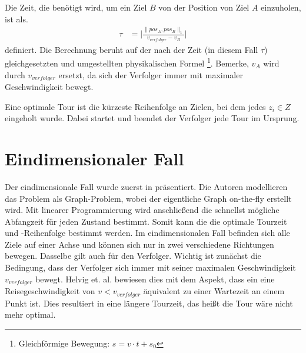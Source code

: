\documentclass[german,version-2019-11]{uzl-thesis}
\begin{document}
\begin{definition}
\label{def:WegZeit}
Die Zeit, die benötigt wird, um ein Ziel $B$ von der Position von Ziel $A$ einzuholen, ist als. 
\begin{align*}
\tau &= \bigg\vert\frac{\|pos_A,pos_B\|_1}{v_{verfolger}-v_B}\bigg\vert
\end{align*} 
definiert.
Die Berechnung beruht auf der nach der Zeit (in diesem Fall $\tau$) gleichgesetzten und umgestellten physikalischen Formel \footnote{Gleichförmige Bewegung: $s=v\cdot t+s_0$}.
Bemerke, $v_A$ wird durch $v_{verfolger}$ ersetzt, da sich der Verfolger immer mit maximaler Geschwindigkeit bewegt.
\end{definition}

\begin{definition} 
Eine optimale Tour ist die kürzeste Reihenfolge an Zielen, bei dem jedes $z_i\in Z$ eingeholt wurde. Dabei startet und beendet der Verfolger jede Tour im Ursprung. 
\end{definition}

\section{Eindimensionaler Fall}
Der eindimensionale Fall wurde zuerst in \cite{helvig} präsentiert. Die Autoren modellieren das Problem als Graph-Problem, wobei der eigentliche Graph on-the-fly erstellt wird. Mit linearer Programmierung wird anschließend die schnellst mögliche Abfangzeit für jeden Zustand bestimmt. Somit kann die die optimale Tourzeit und -Reihenfolge bestimmt werden.
Im eindimensionalen Fall befinden sich alle Ziele auf einer Achse und können sich nur in zwei verschiedene Richtungen bewegen. Dasselbe gilt auch für den Verfolger. Wichtig ist zunächst die Bedingung, dass der Verfolger sich immer mit seiner maximalen Geschwindigkeit $v_{verfolger}$ bewegt. Helvig et. al. bewiesen dies mit dem Aspekt, dass ein eine Reisegeschwindigkeit von $v<v_{verfolger}$ äquivalent zu einer Wartezeit an einem Punkt ist. Dies resultiert in eine längere Tourzeit, das heißt die Tour wäre nicht mehr optimal.
\end{document}
